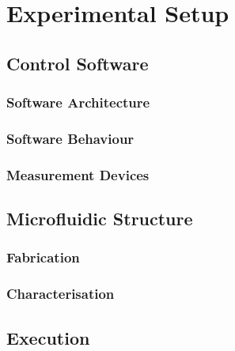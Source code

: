 \chapter{Experimental Setup}
\section{Control Software}
\subsection{Software Architecture}
\subsection{Software Behaviour}
\subsection{Measurement Devices}
\section{Microfluidic Structure}
\subsection{Fabrication}
\subsection{Characterisation}
\section{Execution}